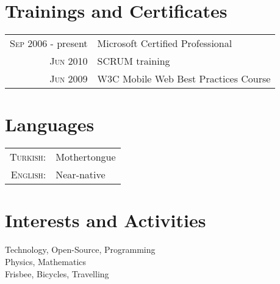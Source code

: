 \documentclass[a4paper,10pt]{article}
\begin{document}
\section{Trainings and Certificates}
\begin{tabular}{rl}
 \textsc{Sep} 2006 - present & Microsoft Certified Professional               \\
 \textsc{Jun} 2010           & \textsc{SCRUM} training                       \\
 \textsc{Jun} 2009           & \textsc{W3C} Mobile Web Best Practices Course \\
\end{tabular}

\section{Languages}
\begin{tabular}{rl}
  \textsc{Turkish:} & Mothertongue \\
  \textsc{English:} & Near-native  \\
\end{tabular}

\section{Interests and Activities}
Technology, Open-Source, Programming \\
Physics, Mathematics \\
Frisbee, Bicycles, Travelling \\
\end{document}
